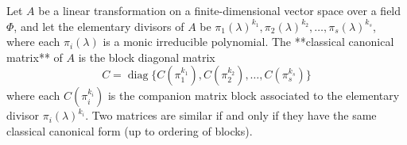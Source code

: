 Let $A$ be a linear transformation on a finite-dimensional vector space over a field $\Phi$, and let the elementary divisors of $A$ be $\pi_1(\lambda)^{k_1}, \pi_2(\lambda)^{k_2}, \ldots, \pi_s(\lambda)^{k_s}$, where each $\pi_i(\lambda)$ is a monic irreducible polynomial. The **classical canonical matrix** of $A$ is the block diagonal matrix
$$C = \operatorname{diag}\{C(\pi_1^{k_1}), C(\pi_2^{k_2}), \ldots, C(\pi_s^{k_s})\}$$
where each $C(\pi_i^{k_i})$ is the companion matrix block associated to the elementary divisor $\pi_i(\lambda)^{k_i}$. Two matrices are similar if and only if they have the same classical canonical form (up to ordering of blocks).
